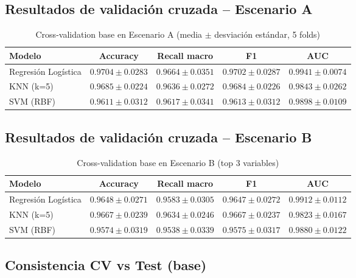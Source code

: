 \documentclass[11pt,a4paper]{article}
\begin{document}
\subsection{Resultados de validación cruzada -- Escenario A}

\begin{table}[H]
\centering
\caption{Cross-validation base en Escenario A (media $\pm$ desviación estándar, 5 folds)}
\small
\renewcommand{\arraystretch}{1.15}
\begin{tabular}{lcccc}
\toprule
\textbf{Modelo} & \textbf{Accuracy} & \textbf{Recall macro} & \textbf{F1} & \textbf{AUC} \\
\midrule
\rowcolor{bestrow}
Regresión Logística & $0.9704 \pm 0.0283$ & $0.9664 \pm 0.0351$ & $0.9702 \pm 0.0287$ & $0.9941 \pm 0.0074$ \\
KNN (k=5) & $0.9685 \pm 0.0224$ & $0.9636 \pm 0.0272$ & $0.9684 \pm 0.0226$ & $0.9843 \pm 0.0262$ \\
SVM (RBF) & $0.9611 \pm 0.0312$ & $0.9617 \pm 0.0341$ & $0.9613 \pm 0.0312$ & $0.9898 \pm 0.0109$ \\
\bottomrule
\end{tabular}
\normalsize
\end{table}

\subsection{Resultados de validación cruzada -- Escenario B}

\begin{table}[H]
\centering
\caption{Cross-validation base en Escenario B (top 3 variables)}
\small
\renewcommand{\arraystretch}{1.15}
\begin{tabular}{lcccc}
\toprule
\textbf{Modelo} & \textbf{Accuracy} & \textbf{Recall macro} & \textbf{F1} & \textbf{AUC} \\
\midrule
Regresión Logística & $0.9648 \pm 0.0271$ & $0.9583 \pm 0.0305$ & $0.9647 \pm 0.0272$ & $0.9912 \pm 0.0112$ \\
\rowcolor{bestrow}
KNN (k=5) & $0.9667 \pm 0.0239$ & $0.9634 \pm 0.0246$ & $0.9667 \pm 0.0237$ & $0.9823 \pm 0.0167$ \\
SVM (RBF) & $0.9574 \pm 0.0319$ & $0.9538 \pm 0.0339$ & $0.9575 \pm 0.0317$ & $0.9880 \pm 0.0122$ \\
\bottomrule
\end{tabular}
\normalsize
\end{table}

\subsection{Consistencia CV vs Test (base)}
\end{document}
